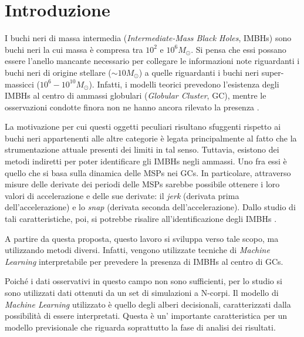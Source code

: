\chapter*{Introduzione}
\label{chap:intro}
I buchi neri di massa intermedia (\textit{Intermediate-Mass Black Holes}, IMBHs) sono buchi neri la cui massa è compresa tra $10^{2}$ e $10^{6}M_{\odot}$. Si pensa che essi possano essere l'anello mancante necessario per collegare le informazioni note riguardanti i buchi neri di origine stellare ($\sim 10 M_{\odot}$) a quelle riguardanti i buchi neri super-massicci ($10^{6}-10^{10}M_{\odot}$). Infatti, i modelli teorici prevedono l'esistenza degli IMBHs al centro di ammassi globulari (\textit{Globular Cluster}, GC), mentre le osservazioni condotte finora non ne hanno ancora rilevato la presenza . 

La motivazione per cui questi oggetti peculiari risultano sfuggenti rispetto ai buchi neri appartenenti alle altre categorie è legata principalmente al fatto che la strumentazione attuale presenti dei limiti in tal senso.  
Tuttavia, esistono dei metodi indiretti per poter identificare gli IMBHs negli ammassi. Uno fra essi è quello che si basa sulla dinamica delle MSPs nei GCs. In particolare, attraverso misure delle derivate dei periodi delle MSPs sarebbe possibile ottenere i loro valori di accelerazione e delle sue derivate: il \textit{jerk} (derivata prima dell'accelerazione) e lo \textit{snap} (derivata seconda dell'accelerazione). Dallo studio di tali caratteristiche, poi, si potrebbe risalire all'identificazione degli IMBHs \cite{abbate1:paper}. 

A partire da questa proposta, questo lavoro si sviluppa verso tale scopo, ma utilizzando metodi diversi. Infatti, vengono utilizzate tecniche di \textit{Machine Learning} interpretabile per prevedere la presenza di IMBHs al centro di GCs. 

Poiché i dati osservativi in questo campo non sono sufficienti, per lo studio si sono utilizzati dati ottenuti da un set di simulazioni a N-corpi. Il modello di \textit{Machine Learning} utilizzato è quello degli alberi decisionali, caratterizzati dalla possibilità di essere interpretati. Questa è un' importante caratteristica per un modello previsionale che riguarda soprattutto la fase di analisi dei risultati. 

